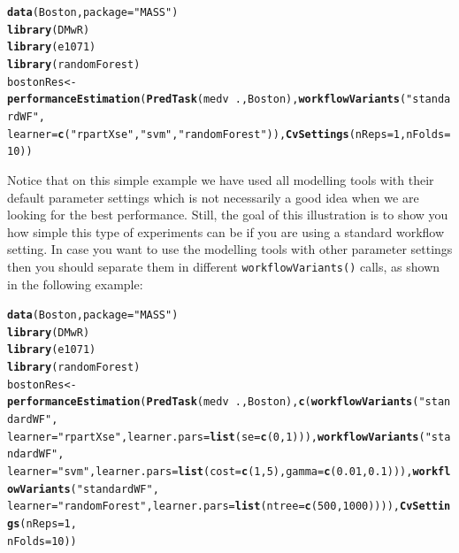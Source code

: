 \documentclass[10pt,a4paper]{article}\usepackage[]{graphicx}\usepackage[]{color}
\makeatletter
\newcommand{\hlnum}[1]{\textcolor[rgb]{0.686,0.059,0.569}{#1}}%
\newcommand{\hlstr}[1]{\textcolor[rgb]{0.192,0.494,0.8}{#1}}%
\newcommand{\hlopt}[1]{\textcolor[rgb]{0,0,0}{#1}}%
\newcommand{\hlstd}[1]{\textcolor[rgb]{0.345,0.345,0.345}{#1}}%
\newcommand{\hlkwb}[1]{\textcolor[rgb]{0.69,0.353,0.396}{#1}}%
\newcommand{\hlkwc}[1]{\textcolor[rgb]{0.333,0.667,0.333}{#1}}%
\newcommand{\hlkwd}[1]{\textcolor[rgb]{0.737,0.353,0.396}{\textbf{#1}}}%
\newenvironment{kframe}{%
 \def\at@end@of@kframe{}%
 \ifinner\ifhmode%
  \def\at@end@of@kframe{\end{minipage}}%
  \begin{minipage}{\columnwidth}%
 \fi\fi%
 \def\FrameCommand##1{\hskip\@totalleftmargin \hskip-\fboxsep
 \colorbox{shadecolor}{##1}\hskip-\fboxsep
     \hskip-\linewidth \hskip-\@totalleftmargin \hskip\columnwidth}%
 \MakeFramed {\advance\hsize-\width
   \@totalleftmargin\z@ \linewidth\hsize
   \@setminipage}}%
 {\par\unskip\endMakeFramed%
 \at@end@of@kframe}
\newenvironment{knitrout}{}{} %
\makeatother
\begin{document}
\begin{knitrout}
\color{fgcolor}\begin{kframe}
\begin{alltt}
\hlkwd{data}\hlstd{(Boston,} \hlkwc{package} \hlstd{=} \hlstr{"MASS"}\hlstd{)}
\hlkwd{library}\hlstd{(DMwR)}
\hlkwd{library}\hlstd{(e1071)}
\hlkwd{library}\hlstd{(randomForest)}
\hlstd{bostonRes} \hlkwb{<-} \hlkwd{performanceEstimation}\hlstd{(}\hlkwd{PredTask}\hlstd{(medv} \hlopt{~} \hlstd{., Boston),} \hlkwd{workflowVariants}\hlstd{(}\hlstr{"standardWF"}\hlstd{,}
    \hlkwc{learner} \hlstd{=} \hlkwd{c}\hlstd{(}\hlstr{"rpartXse"}\hlstd{,} \hlstr{"svm"}\hlstd{,} \hlstr{"randomForest"}\hlstd{)),} \hlkwd{CvSettings}\hlstd{(}\hlkwc{nReps} \hlstd{=} \hlnum{1}\hlstd{,} \hlkwc{nFolds} \hlstd{=} \hlnum{10}\hlstd{))}
\end{alltt}
\end{kframe}
\end{knitrout}


Notice that on this simple example we have used all modelling tools
with their default parameter settings which is not necessarily a good
idea when we are looking for the best performance. Still, the goal of
this illustration is to show you how simple this type of experiments
can be if you are using a standard workflow setting. In case you want
to use the modelling tools with other parameter settings then you
should separate them in different \texttt{workflowVariants()} calls, as shown
in the following example:

\begin{knitrout}
\color{fgcolor}\begin{kframe}
\begin{alltt}
\hlkwd{data}\hlstd{(Boston,} \hlkwc{package} \hlstd{=} \hlstr{"MASS"}\hlstd{)}
\hlkwd{library}\hlstd{(DMwR)}
\hlkwd{library}\hlstd{(e1071)}
\hlkwd{library}\hlstd{(randomForest)}
\hlstd{bostonRes} \hlkwb{<-} \hlkwd{performanceEstimation}\hlstd{(}\hlkwd{PredTask}\hlstd{(medv} \hlopt{~} \hlstd{., Boston),} \hlkwd{c}\hlstd{(}\hlkwd{workflowVariants}\hlstd{(}\hlstr{"standardWF"}\hlstd{,}
    \hlkwc{learner} \hlstd{=} \hlstr{"rpartXse"}\hlstd{,} \hlkwc{learner.pars} \hlstd{=} \hlkwd{list}\hlstd{(}\hlkwc{se} \hlstd{=} \hlkwd{c}\hlstd{(}\hlnum{0}\hlstd{,} \hlnum{1}\hlstd{))),} \hlkwd{workflowVariants}\hlstd{(}\hlstr{"standardWF"}\hlstd{,}
    \hlkwc{learner} \hlstd{=} \hlstr{"svm"}\hlstd{,} \hlkwc{learner.pars} \hlstd{=} \hlkwd{list}\hlstd{(}\hlkwc{cost} \hlstd{=} \hlkwd{c}\hlstd{(}\hlnum{1}\hlstd{,} \hlnum{5}\hlstd{),} \hlkwc{gamma} \hlstd{=} \hlkwd{c}\hlstd{(}\hlnum{0.01}\hlstd{,} \hlnum{0.1}\hlstd{))),} \hlkwd{workflowVariants}\hlstd{(}\hlstr{"standardWF"}\hlstd{,}
    \hlkwc{learner} \hlstd{=} \hlstr{"randomForest"}\hlstd{,} \hlkwc{learner.pars} \hlstd{=} \hlkwd{list}\hlstd{(}\hlkwc{ntree} \hlstd{=} \hlkwd{c}\hlstd{(}\hlnum{500}\hlstd{,} \hlnum{1000}\hlstd{)))),} \hlkwd{CvSettings}\hlstd{(}\hlkwc{nReps} \hlstd{=} \hlnum{1}\hlstd{,}
    \hlkwc{nFolds} \hlstd{=} \hlnum{10}\hlstd{))}
\end{alltt}
\end{kframe}
\end{knitrout}
\end{document}
